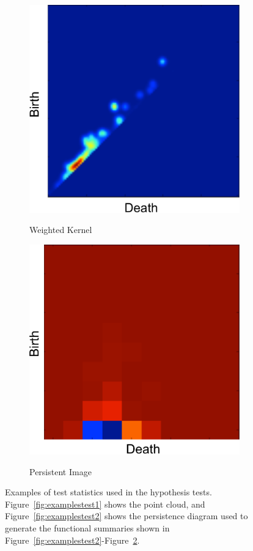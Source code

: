 \documentclass[12pt]{article}
\newcommand{\figref}[1]{Figure~\ref{#1}}
\begin{document}
\begin{figure}[htbp]
\begin{subfigure}{.24\textwidth}
        \caption{Weighted Kernel}   \includegraphics[width=\linewidth]{test_pics_7.pdf}
    \label{fig:examplestest7}
  \end{subfigure}
    \begin{subfigure}{.24\textwidth}
    \centering
        \caption{Persistent Image}  \includegraphics[width=\linewidth]{test_pics_8.pdf}
    \label{fig:examplestest8}
  \end{subfigure}
   \caption{Examples of test statistics used in the hypothesis tests. \figref{fig:examplestest1} shows the point cloud, and \figref{fig:examplestest2} shows the persistence diagram used to generate the functional summaries shown in \figref{fig:examplestest2}-\figref{fig:examplestest8}.}
   \label{fig:examples}
\end{figure}
\end{document}
